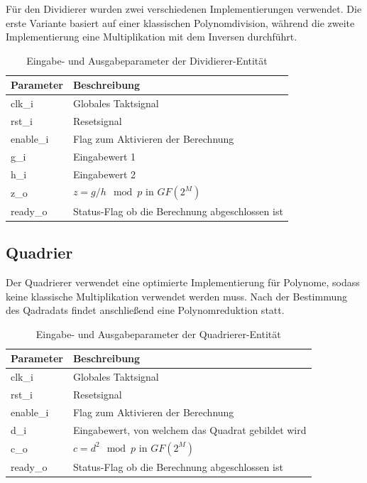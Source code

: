 Für den Dividierer wurden zwei verschiedenen Implementierungen verwendet. Die erste Variante basiert auf einer klassischen Polynomdivision, während die zweite Implementierung eine Multiplikation mit dem Inversen durchführt. \\

\begin{table} [h]
	\centering 
	\begin{tabular}{ | p{3cm} | p{12cm} | }
		\hline
		\textbf{Parameter} & \textbf{Beschreibung}\\
		\hline
		clk\_i & Globales Taktsignal \\
		\hline
		rst\_i & Resetsignal \\
		\hline
		enable\_i & Flag zum Aktivieren der Berechnung \\
		\hline
		g\_i & Eingabewert 1 \\
		\hline
		h\_i & Eingabewert 2 \\
		\hline
		z\_o & $z = g/h \mod p$ in $GF(2^M)$ \\
		\hline
		ready\_o & Status-Flag ob die Berechnung abgeschlossen ist  \\
		\hline
		\hline
	\end{tabular}
	\caption{Eingabe- und Ausgabeparameter der Dividierer-Entität}
	\label{tab:vhdl-impl-divider-param}
\end{table}

\subsection{Quadrier}
Der Quadrierer verwendet eine optimierte Implementierung für Polynome, sodass keine klassische Multiplikation verwendet werden muss. Nach der Bestimmung des Qadradats findet anschließend eine Polynomreduktion statt. 

\begin{table} [h]
	\centering 
	\begin{tabular}{ | p{3cm} | p{12cm} | }
		\hline
		\textbf{Parameter} & \textbf{Beschreibung}\\
		\hline
		clk\_i & Globales Taktsignal \\
		\hline
		rst\_i & Resetsignal \\
		\hline
		enable\_i & Flag zum Aktivieren der Berechnung \\
		\hline
		d\_i & Eingabewert, von welchem das Quadrat gebildet wird \\
		\hline
		c\_o & $c = d^2 \mod p$ in $GF(2^M)$ \\
		\hline
		ready\_o & Status-Flag ob die Berechnung abgeschlossen ist  \\
		\hline
		\hline
	\end{tabular}
	\caption{Eingabe- und Ausgabeparameter der Quadrierer-Entität}
	\label{tab:vhdl-impl-squarer-param}
\end{table}

